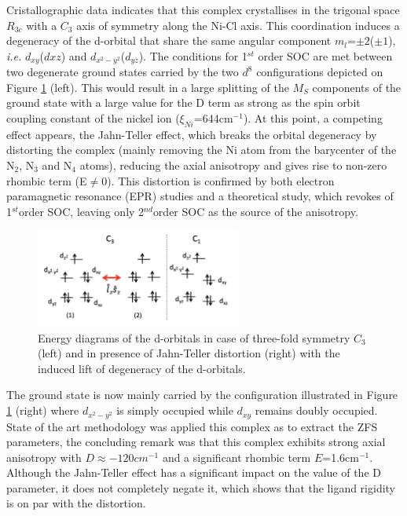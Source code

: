 \documentclass[12pt]{report}
\numberwithin{equation}{section}
\begin{document}
Cristallographic data indicates that this complex crystallises in the trigonal space $R_{3c}$ with a $C_3$ axis of symmetry along the Ni-Cl axis.
This coordination induces a degeneracy of the d-orbital that share the same angular component $m_l$=$\pm2$($\pm1$), \textit{i.e.} $d_{xy}$($d{xz}$) and $d_{x^2-y^2}$($d_{yz}$). 
The conditions for 1$^{st}$ order SOC are met between two degenerate ground states carried by the two $d^8$ configurations depicted on Figure \ref{NiMe6tren_config} (left).
This would result in a large splitting of the $M_S$ components of the ground state with a large value for the D term as strong as the spin orbit coupling constant of the nickel ion ($\xi_{Ni}$=644cm$^{-1}$).
At this point, a competing effect appears, the Jahn-Teller effect, which breaks the orbital degeneracy by distorting the complex (mainly removing the Ni atom from the barycenter of the N$_2$, N$_3$ and N$_4$ atoms), reducing the axial anisotropy and gives rise to non-zero rhombic term (E$\neq$0).
This distortion is confirmed by both electron paramagnetic resonance (EPR) studies and a theoretical study, which revokes of 1$^{st}$order SOC, leaving only 2$^{nd}$order SOC as the source of the anisotropy.

\begin{figure}
    \centering
    \includegraphics[width=0.6\textwidth]{Images/NiMe6tren_config.png}
    \caption[Energy diagrams of the d-orbitals in $C_3$ symmetre and affected by Jahn-Teller distortion]{Energy diagrams of the d-orbitals in case of three-fold symmetry $C_3$ (left) and in presence of Jahn-Teller distortion (right) with the induced lift of degeneracy of the d-orbitals. }
    \label{NiMe6tren_config}
\end{figure}

The ground state is now mainly carried by the configuration illustrated in Figure \ref{NiMe6tren_config} (right) where $d_{x^2-y^2}$ is simply occupied while $d_{xy}$ remains doubly occupied.
State of the art methodology was applied this complex as to extract the ZFS parameters, the concluding remark was that this complex exhibits strong axial anisotropy with $D\approx-120cm^{-1}$ and a significant rhombic term $E$=1.6cm$^{-1}$. 
Although the Jahn-Teller effect has a significant impact on the value of the D parameter, it does not completely negate it, which shows that the ligand rigidity is on par with the distortion.
\end{document}
